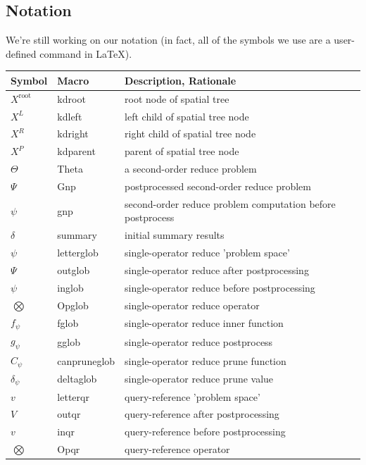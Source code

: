 \documentclass[twoside,leqno,twocolumn]{article}
\newcommand{\summary}{\delta}
\newcommand{\Gnp}{\Psi}
\newcommand{\gnp}{\psi}
\newcommand{\kdroot}[1]{#1^{\text{root}}}
\newcommand{\kdleft}[1]{#1^{\!L}}
\newcommand{\kdright}[1]{#1^{\!R}}
\newcommand{\kdparent}[1]{#1^{\!P}}
\newcommand{\nameOp}[2]{\mathop{#1\nolimits\!\!_{#2}}}
\newcommand{\myOp}[1]{\nameOp{\bigotimes}{#1}}
\newcommand{\letterglob}{\psi}
\newcommand{\outglob}{\Psi}
\newcommand{\inglob}{\psi}
\newcommand{\Opglob}{\myOp{\letterglob}}
\newcommand{\fglob}{f_{\!\letterglob}}
\newcommand{\gglob}{g_{\!\letterglob}}
\newcommand{\canpruneglob}{C_{\!\letterglob}}
\newcommand{\deltaglob}{\summary_{\!\letterglob}}
\newcommand{\letterqr}{v}
\newcommand{\outqr}{V}
\newcommand{\inqr}{v}
\newcommand{\Opqr}{\myOp{\letterqr}}
\begin{document}
\begin{appendix}

\section{Notation}

We're still working on our notation (in fact, all of the symbols we use are a user-defined command in LaTeX).

\begin{table}
\begin{tabular}{|l|l|l|}
\hline
Symbol & Macro & Description, Rationale
\\ \hline $\kdroot{X}$ & kdroot & root node of spatial tree
\\ $\kdleft{X}$ & kdleft & left child of spatial tree node
\\ $\kdright{X}$ & kdright & right child of spatial tree node
\\ $\kdparent{X}$ & kdparent & parent of spatial tree node
\\ \hline $\Theta$ & Theta & a second-order reduce problem
\\ $\Gnp$ & Gnp & postprocessed second-order reduce problem
\\ $\gnp$ & gnp & second-order reduce problem computation before postprocess
\\ $\summary$ & summary & initial summary results
\\ \hline $\letterglob$ & letterglob & single-operator reduce 'problem space'
\\ $\outglob$ & outglob & single-operator reduce after postprocessing
\\ $\inglob$ & inglob & single-operator reduce before postprocessing
\\ $\Opglob$ & Opglob & single-operator reduce operator
\\ $\fglob$ & fglob & single-operator reduce inner function
\\ $\gglob$ & gglob & single-operator reduce postprocess
\\ $\canpruneglob$ & canpruneglob & single-operator reduce prune function
\\ $\deltaglob$ & deltaglob & single-operator reduce prune value
\\ \hline $\letterqr$ & letterqr & query-reference 'problem space'
\\ $\outqr$ & outqr & query-reference after postprocessing
\\ $\inqr$ & inqr & query-reference before postprocessing
\\ $\Opqr$ & Opqr & query-reference operator

\end{tabular}
\end{table}
\end{appendix}
\end{document}
